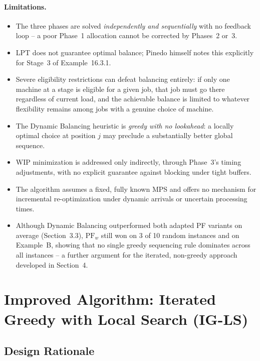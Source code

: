 \documentclass[11pt,a4paper]{article}
\begin{document}
\paragraph{Limitations.}
\begin{itemize}
  \item The three phases are solved \emph{independently and sequentially}
    with no feedback loop -- a poor Phase~1 allocation cannot be corrected
    by Phases~2 or~3.
  \item LPT does not guarantee optimal balance; Pinedo himself notes this
    explicitly for Stage~3 of Example~16.3.1.
  \item Severe eligibility restrictions can defeat balancing entirely: if
    only one machine at a stage is eligible for a given job, that job
    must go there regardless of current load, and the achievable balance
    is limited to whatever flexibility remains among jobs with a genuine
    choice of machine.
  \item The Dynamic Balancing heuristic is \emph{greedy with no lookahead}:
    a locally optimal choice at position $j$ may preclude a substantially
    better global sequence.
  \item WIP minimization is addressed only indirectly, through Phase~3's
    timing adjustments, with no explicit guarantee against blocking under
    tight buffers.
  \item The algorithm assumes a fixed, fully known MPS and offers no
    mechanism for incremental re-optimization under dynamic arrivals or
    uncertain processing times.
  \item Although Dynamic Balancing outperformed both adapted PF variants
    on average (Section~3.3), $\mathrm{PF}_w$ still won on 3 of 10 random
    instances and on Example~B, showing that no single greedy sequencing
    rule dominates across all instances -- a further argument for the
    iterated, non-greedy approach developed in Section~4.
\end{itemize}

\section{Improved Algorithm: Iterated Greedy with Local Search (IG-LS)}

\subsection{Design Rationale}
\end{document}

